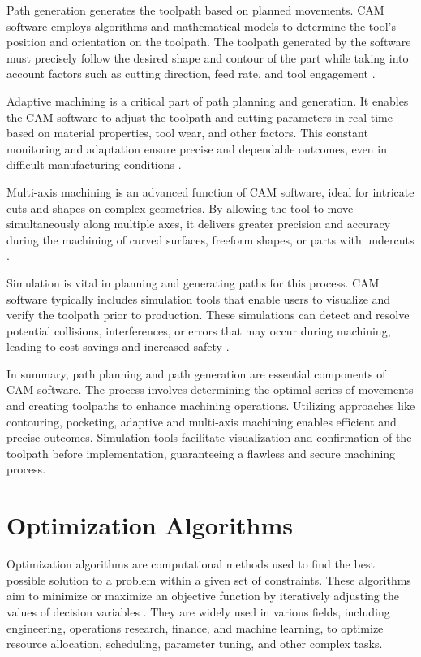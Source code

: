 Path generation generates the toolpath based on planned movements. CAM software employs algorithms and mathematical models to determine the tool's position and orientation on the toolpath. The toolpath generated by the software must precisely follow the desired shape and contour of the part while taking into account factors such as cutting direction, feed rate, and tool engagement \cite{Tunc.2017}.

Adaptive machining is a critical part of path planning and generation. It enables the CAM software to adjust the toolpath and cutting parameters in real-time based on material properties, tool wear, and other factors. This constant monitoring and adaptation ensure precise and dependable outcomes, even in difficult manufacturing conditions \cite{Liu.2017}.

Multi-axis machining is an advanced function of CAM software, ideal for intricate cuts and shapes on complex geometries. By allowing the tool to move simultaneously along multiple axes, it delivers greater precision and accuracy during the machining of curved surfaces, freeform shapes, or parts with undercuts \cite{Takeuchi.2014}.

Simulation is vital in planning and generating paths for this process. CAM software typically includes simulation tools that enable users to visualize and verify the toolpath prior to production. These simulations can detect and resolve potential collisions, interferences, or errors that may occur during machining, leading to cost savings and increased safety \cite{Dubovska.2014}. 

In summary, path planning and path generation are essential components of CAM software. The process involves determining the optimal series of movements and creating toolpaths to enhance machining operations. Utilizing approaches like contouring, pocketing, adaptive and multi-axis machining enables efficient and precise outcomes. Simulation tools facilitate visualization and confirmation of the toolpath before implementation, guaranteeing a flawless and secure machining process.


\section{Optimization Algorithms}%

Optimization algorithms are computational methods used to find the best possible solution to a problem within a given set of constraints. These algorithms aim to minimize or maximize an objective function by iteratively adjusting the values of decision variables \cite{Sivanandam.2007b}. They are widely used in various fields, including engineering, operations research, finance, and machine learning, to optimize resource allocation, scheduling, parameter tuning, and other complex tasks.


